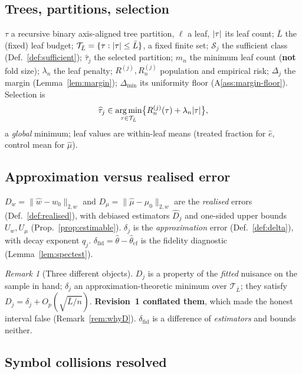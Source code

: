 \documentclass[11pt]{article}
\theoremstyle{plain}
\theoremstyle{definition}
\theoremstyle{remark}
\newtheorem{remark}{Remark}
\newcommand{\cT}{\mathcal{T}}
\newcommand{\cS}{\mathcal{S}}
\newcommand{\mz}{\mu_0}
\newcommand{\wz}{w_0}
\newcommand{\ehat}{\widehat{e}}
\newcommand{\mhat}{\widehat{\mu}}
\newcommand{\what}{\widehat{w}}
\newcommand{\that}{\widehat{\tau}}
\newcommand{\thetahat}{\widehat{\theta}}
\newcommand{\Dw}{D_w}
\newcommand{\Dm}{D_\mu}
\newcommand{\Lw}[1]{\lVert #1 \rVert_{2,w}}
\DeclareMathOperator*{\argmin}{arg\,min}
\DeclarePairedDelimiter{\card}{\lvert}{\rvert}
\begin{document}
\subsection{Trees, partitions, selection}

$\tau$ a recursive binary axis-aligned tree partition, $\ell$ a leaf,
$\card\tau$ its leaf count; $\bar L$ the (fixed) leaf budget;
$\cT_{\bar L}=\{\tau:\card\tau\le\bar L\}$, a fixed finite set;
$\cS_j$ the sufficient class (Def.~\ref{def:sufficient}); $\that_j$ the selected
partition; $m_n$ the minimum leaf count (\textbf{not} fold size); $\lambda_n$ the
leaf penalty; $R^{(j)},R^{(j)}_n$ population and empirical risk; $\Delta_j$ the
margin (Lemma~\ref{lem:margin}); $\Delta_{\min}$ its uniformity floor
(A\ref{ass:margin-floor}). Selection is
\begin{equation}\label{eq:select}
  \that_j\in\argmin_{\tau\in\cT_{\bar L}}
  \bigl\{R^{(j)}_n(\tau)+\lambda_n\card\tau\bigr\},
\end{equation}
a \emph{global} minimum; leaf values are within-leaf means (treated fraction for
$\ehat$, control mean for $\mhat$).

\subsection{Approximation versus realised error}

$\Dw=\Lw{\what-\wz}$ and $\Dm=\Lw{\mhat-\mz}$ are the \emph{realised} errors
(Def.~\ref{def:realised}), with debiased estimators $\widehat D_j$ and one-sided
upper bounds $U_w,U_\mu$ (Prop.~\ref{prop:estimable}). $\delta_j$ is the
\emph{approximation} error (Def.~\ref{def:delta}), with decay exponent $q_j$.
$\delta_{\mathrm{fid}}=\thetahat-\thetahat_{\mathrm{cf}}$ is the fidelity
diagnostic (Lemma~\ref{lem:spectest}).

\begin{remark}[Three different objects]\label{rem:D-vs-delta}
$D_j$ is a property of the \emph{fitted} nuisance on the sample in hand;
$\delta_j$ an approximation-theoretic minimum over $\cT_{\bar L}$; they satisfy
$D_j=\delta_j+O_p(\sqrt{\bar L/n})$. \textbf{Revision~1 conflated them}, which
made the honest interval false (Remark~\ref{rem:whyD}). $\delta_{\mathrm{fid}}$ is
a difference of \emph{estimators} and bounds neither.
\end{remark}

\subsection{Symbol collisions resolved}\label{sec:collisions}
\end{document}
